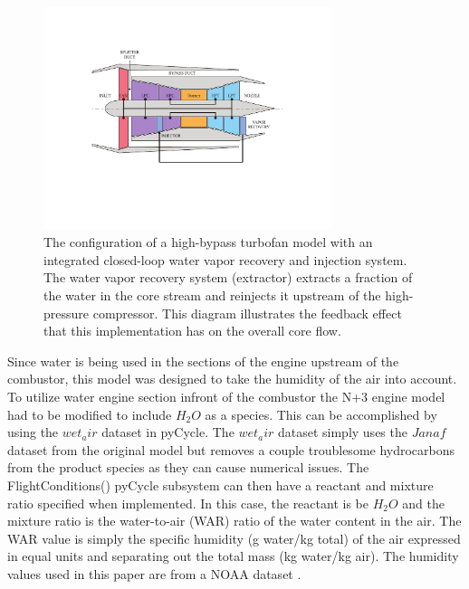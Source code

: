 \documentclass[conf]{new-aiaa}
\begin{document}
\begin{figure}[hbt!]
  \centering
  \includegraphics[width=0.75\textwidth]{turbofan_wvr.pdf}
  \caption{
    The configuration of a high-bypass turbofan model with an integrated closed-loop water vapor recovery and injection system.
    The water vapor recovery system (extractor) extracts a fraction of the water in the core stream and reinjects it upstream of the high-pressure compressor.
    This diagram illustrates the feedback effect that this implementation has on the overall core flow.}
  \label{fig:n3_cycle}
\end{figure}

Since water is being used in the sections of the engine upstream of the combustor, this model was designed to take the humidity of the air into account.
To utilize water engine section infront of the combustor the N+3 engine model had to be modified to include $H_2O$ as a species.
This can be accomplished by using the $wet_air$ dataset in pyCycle.
The $wet_air$ dataset simply uses the $Janaf$ dataset from the original model but removes a couple troublesome hydrocarbons from the product species as they can cause numerical issues.
The FlightConditions() pyCycle subsystem can then have a reactant and mixture ratio specified when implemented.
In this case, the reactant is be $H_2O$ and the mixture ratio is the water-to-air (WAR) ratio of the water content in the air.
The WAR value is simply the specific humidity (g water/kg total) of the air expressed in equal units and separating out the total mass (kg water/kg air).
The humidity values used in this paper are from a NOAA dataset \cite{Kalnay1996}.
\end{document}
